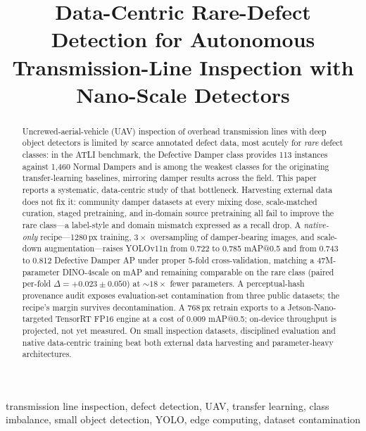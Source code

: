 \documentclass[conference]{IEEEtran}
\makeatletter
\newcommand{\map}{mAP@0.5}
\makeatother
\begin{document}
\title{Data-Centric Rare-Defect Detection for Autonomous Transmission-Line Inspection with Nano-Scale Detectors}

\author{
}

\maketitle

\begin{abstract}
Uncrewed-aerial-vehicle (UAV) inspection of overhead transmission lines with deep object detectors is limited by scarce annotated defect data, most acutely for \emph{rare} defect classes: in the ATLI benchmark, the Defective Damper class provides 113 instances against 1{,}460 Normal Dampers and is among the weakest classes for the originating transfer-learning baselines, mirroring damper results across the field. This paper reports a systematic, data-centric study of that bottleneck. Harvesting external data does not fix it: community damper datasets at every mixing dose, scale-matched curation, staged pretraining, and in-domain source pretraining all fail to improve the rare class---a label-style and domain mismatch expressed as a recall drop. A \emph{native-only} recipe---1280\,px training, $3\times$ oversampling of damper-bearing images, and scale-down augmentation---raises YOLOv11n from 0.722 to 0.785 \map{} and from 0.743 to 0.812 Defective Damper AP under proper 5-fold cross-validation, matching a 47M-parameter DINO-4scale on mAP and remaining comparable on the rare class (paired per-fold $\Delta{=}{+}0.023\pm0.050$) at ${\sim}18\times$ fewer parameters. A perceptual-hash provenance audit exposes evaluation-set contamination from three public datasets; the recipe's margin survives decontamination. A 768\,px retrain exports to a Jetson-Nano-targeted TensorRT FP16 engine at a cost of 0.009 \map{}; on-device throughput is projected, not yet measured. On small inspection datasets, disciplined evaluation and native data-centric training beat both external data harvesting and parameter-heavy architectures.
\end{abstract}

\begin{IEEEkeywords}
transmission line inspection, defect detection, UAV, transfer learning, class imbalance, small object detection, YOLO, edge computing, dataset contamination
\end{IEEEkeywords}
\end{document}
